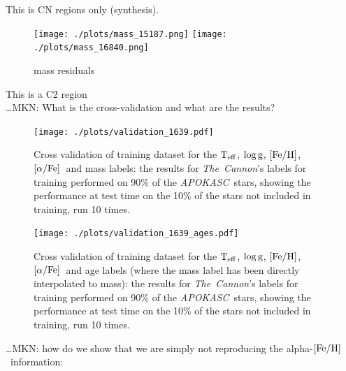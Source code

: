 \documentclass[12pt, preprint]{aastex}
\newcommand{\project}[1]{\textsl{#1}}
\newcommand{\tc}{\project{The~Cannon}}
\newcommand{\apokasc}{\project{APOKASC}}
\newcommand{\teff}{\mbox{$\rm T_{eff}$}}
\newcommand{\feh}{\mbox{$\rm [Fe/H]$}}
\newcommand{\alphafe}{\mbox{$\rm [\alpha/Fe]$}}
\newcommand{\logg}{\mbox{$\rm \log g$}}
\begin{document}
This is CN regions only (synthesis). \\

\begin{figure}[p!]
\centering
    \texttt{[image: ./plots/mass\_15187.png]}
        \texttt{[image: ./plots/mass\_16840.png]}
  \caption{mass residuals}
\label{fig:validation}
\end{figure}

This is a C2 region \\

\ldots MKN: What is the cross-validation and what are the results?
\begin{figure}[p!]
\centering
        \texttt{[image: ./plots/validation\_1639.pdf]}
  \caption{Cross validation of training dataset for the \teff, \logg, \feh, \alphafe\ and mass labels: the results for \tc's labels for training performed on 90\% of the \apokasc\ stars, showing the performance at test time on the 10\% of the stars not included in training, run 10 times.}
\label{fig:validation}
\end{figure}

\begin{figure}[p!]
\centering
        \texttt{[image: ./plots/validation\_1639\_ages.pdf]}
  \caption{Cross validation of training dataset for the \teff, \logg, \feh, \alphafe\ and age labels (where the mass label has been directly interpolated to mass): the results for \tc's labels for training performed on 90\% of the \apokasc\ stars, showing the performance at test time on the 10\% of the stars not included in training, run 10 times.}
\label{fig:validation}
\end{figure}


\ldots MKN: how do we show that we are simply not reproducing the alpha-\feh\ information:
\end{document}
